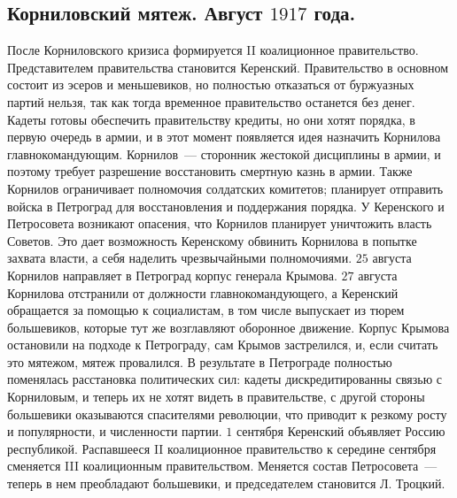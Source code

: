 \documentclass[12pt]{article}
\begin{document}
	\subsection{Корниловский мятеж. Август $1917$ года.}
	После Корниловского кризиса формируется II коалиционное правительство. Представителем правительства становится Керенский. Правительство в основном состоит из эсеров и меньшевиков, но полностью отказаться от буржуазных партий нельзя, так как тогда временное правительство останется без денег. Кадеты готовы обеспечить правительству кредиты, но они хотят порядка, в первую очередь в армии, и в этот момент появляется идея назначить Корнилова главнокомандующим. Корнилов~--- сторонник жестокой дисциплины в армии, и поэтому требует разрешение восстановить смертную казнь в армии. Также Корнилов ограничивает полномочия солдатских комитетов; планирует отправить войска в Петроград для восстановления и поддержания порядка. У Керенского и Петросовета возникают опасения, что Корнилов планирует уничтожить власть Советов. Это дает возможность Керенскому обвинить Корнилова в попытке захвата власти, а себя наделить чрезвычайными полномочиями. $25$ августа Корнилов направляет в Петроград корпус генерала Крымова. $27$ августа Корнилова отстранили от должности главнокомандующего, а Керенский обращается за помощью к социалистам, в том числе выпускает из тюрем большевиков, которые тут же возглавляют оборонное движение. Корпус Крымова остановили на подходе к Петрограду, сам Крымов застрелился, и, если считать это мятежом, мятеж провалился. В результате в Петрограде полностью поменялась расстановка политических сил: кадеты дискредитированны связью с Корниловым, и теперь их не хотят видеть в правительстве, с другой стороны большевики оказываются спасителями революции, что приводит к резкому росту и популярности, и численности партии. $1$ сентября Керенский объявляет Россию республикой. Распавшееся II коалиционное правительство к середине сентября сменяется III коалиционным правительством. Меняется состав Петросовета~--- теперь в нем преобладают большевики, и председателем становится Л. Троцкий.
\end{document}
